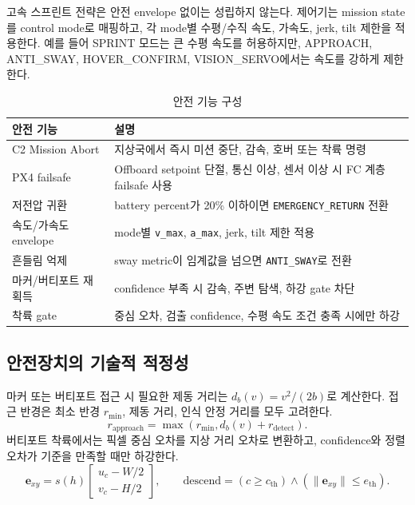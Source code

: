 \documentclass[10pt,a4paper]{article}
\newcommand{\code}[1]{\texttt{#1}}
\begin{document}
고속 스프린트 전략은 안전 envelope 없이는 성립하지 않는다. 제어기는 mission state를 control mode로 매핑하고, 각 mode별 수평/수직 속도, 가속도, jerk, tilt 제한을 적용한다. 예를 들어 SPRINT 모드는 큰 수평 속도를 허용하지만, APPROACH, ANTI\_SWAY, HOVER\_CONFIRM, VISION\_SERVO에서는 속도를 강하게 제한한다.

\begin{table}[H]
\centering
\small
\caption{안전 기능 구성}
\begin{tabularx}{\linewidth}{p{35mm}Y}
\toprule
\textbf{안전 기능} & \textbf{설명}\\
\midrule
C2 Mission Abort & 지상국에서 즉시 미션 중단, 감속, 호버 또는 착륙 명령\\
PX4 failsafe & Offboard setpoint 단절, 통신 이상, 센서 이상 시 FC 계층 failsafe 사용\\
저전압 귀환 & battery percent가 20\% 이하이면 \code{EMERGENCY\_RETURN} 전환\\
속도/가속도 envelope & mode별 \code{v\_max}, \code{a\_max}, jerk, tilt 제한 적용\\
흔들림 억제 & sway metric이 임계값을 넘으면 \code{ANTI\_SWAY}로 전환\\
마커/버티포트 재획득 & confidence 부족 시 감속, 주변 탐색, 하강 gate 차단\\
착륙 gate & 중심 오차, 검출 confidence, 수평 속도 조건 충족 시에만 하강\\
\bottomrule
\end{tabularx}
\end{table}

\subsection{안전장치의 기술적 적정성}

마커 또는 버티포트 접근 시 필요한 제동 거리는 $d_b(v)=v^2/(2b)$로 계산한다. 접근 반경은 최소 반경 $r_{\min}$, 제동 거리, 인식 안정 거리를 모두 고려한다.
\begin{equation}
r_{\mathrm{approach}}=\max(r_{\min}, d_b(v)+r_{\mathrm{detect}}).
\end{equation}
버티포트 착륙에서는 픽셀 중심 오차를 지상 거리 오차로 변환하고, confidence와 정렬 오차가 기준을 만족할 때만 하강한다.
\begin{equation}
\mathbf{e}_{xy}=
s(h)
\begin{bmatrix}
u_c-W/2\\
v_c-H/2
\end{bmatrix},
\qquad
\mathrm{descend}=
(c\ge c_{\mathrm{th}})\land(\lVert\mathbf{e}_{xy}\rVert\le e_{\mathrm{th}}).
\end{equation}
\end{document}
